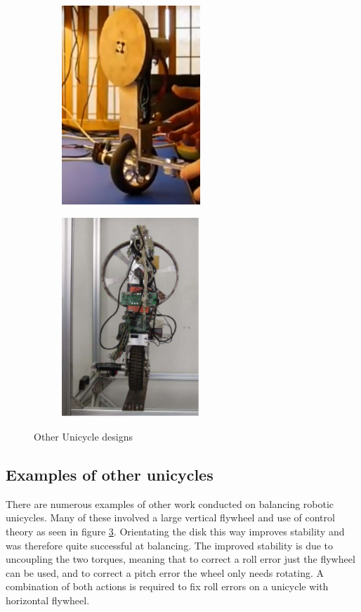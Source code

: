 \documentclass[twoside,twocolumn,12pt]{article}
\begin{document}
\begin{figure}[t!]
  \centering
  \begin{subfigure}[t]{0.325\textwidth}
    \includegraphics[width=\linewidth,height=7.5cm]{other1}
   \caption{\cite{other1}}
  \label{sub:oother1}
  \end{subfigure}
  \begin{subfigure}[t]{0.325\textwidth}
    \includegraphics[width=\linewidth,height=7.5cm]{other3}
    \caption{\cite{other2}}
  \label{sub:other2}
  \end{subfigure}
  \caption{Other Unicycle designs}
  \label{fig:otheruni}
\end{figure}

\subsection{Examples of other unicycles}
There are numerous examples of other work conducted on balancing robotic unicycles. Many of these involved a large vertical flywheel and use of control theory as seen in figure \ref{fig:otheruni}. Orientating the disk this way improves stability and was therefore quite successful at balancing. The improved stability is due to uncoupling the two torques, meaning that to correct a roll error just the flywheel can be used, and to correct a pitch error the wheel only needs rotating. A combination of both actions is required to fix roll errors on a unicycle with horizontal flywheel.
\end{document}
